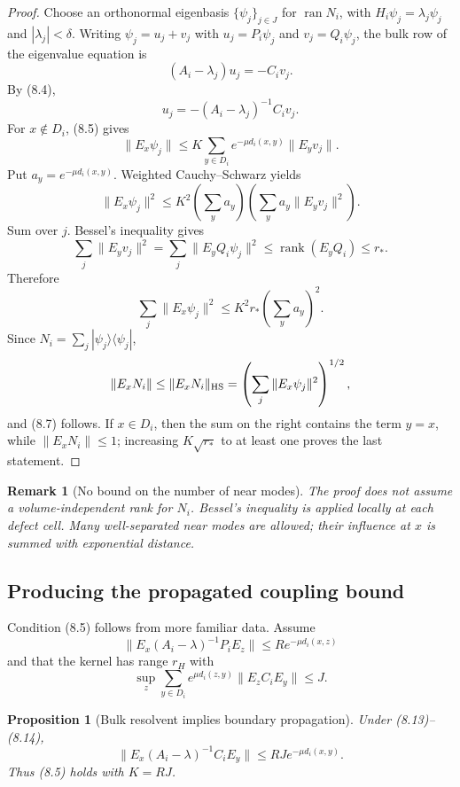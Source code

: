\documentclass[11pt]{article}
\newtheorem{proposition}[theorem]{Proposition}
\newtheorem{remark}[theorem]{Remark}
\begin{document}
\begin{proof}
Choose an orthonormal eigenbasis
\(\{\psi_j\}_{j\in J}\) for \(\operatorname{ran}N_i\), with
\(H_i\psi_j=\lambda_j\psi_j\) and \(|\lambda_j|<\delta\).
Writing \(\psi_j=u_j+v_j\) with
\(u_j=P_i\psi_j\) and \(v_j=Q_i\psi_j\), the bulk row of the eigenvalue
equation is
\[
 (A_i-\lambda_j)u_j=-C_iv_j.
\]
By (8.4),
\[
 u_j=-(A_i-\lambda_j)^{-1}C_iv_j.
 \tag{8.8}
\]
For \(x\notin D_i\), (8.5) gives
\[
 \|E_x\psi_j\|
 \leq
 K\sum_{y\in D_i}e^{-\mu d_i(x,y)}\|E_yv_j\|.
 \tag{8.9}
\]
Put \(a_y=e^{-\mu d_i(x,y)}\).  Weighted Cauchy--Schwarz yields
\[
 \|E_x\psi_j\|^2
 \leq
 K^2\left(\sum_ya_y\right)
 \left(\sum_ya_y\|E_yv_j\|^2\right).
 \tag{8.10}
\]
Sum over \(j\).  Bessel's inequality gives
\[
 \sum_j\|E_yv_j\|^2
 =
 \sum_j\|E_yQ_i\psi_j\|^2
 \leq\operatorname{rank}(E_yQ_i)\leq r_*.
 \tag{8.11}
\]
Therefore
\[
 \sum_j\|E_x\psi_j\|^2
 \leq
 K^2r_*\left(\sum_ya_y\right)^2.
 \tag{8.12}
\]
Since
\(N_i=\sum_j|\psi_j\rangle\langle\psi_j|\),
\[
 \|E_xN_i\|
 \leq\|E_xN_i\|_{\rm HS}
 =
 \left(\sum_j\|E_x\psi_j\|^2\right)^{1/2},
\]
and (8.7) follows.  If \(x\in D_i\), then the sum on the right contains
the term \(y=x\), while \(\|E_xN_i\|\leq1\); increasing
\(K\sqrt{r_*}\) to at least one proves the last statement.
\end{proof}

\begin{remark}[No bound on the number of near modes]
\label{rem:v11v8-rank}
The proof does not assume a volume-independent rank for \(N_i\).
Bessel's inequality is applied locally at each defect cell.  Many
well-separated near modes are allowed; their influence at \(x\) is
summed with exponential distance.
\end{remark}

\subsection{Producing the propagated coupling bound}

Condition (8.5) follows from more familiar data.  Assume
\[
 \|E_x(A_i-\lambda)^{-1}P_iE_z\|
 \leq R e^{-\mu d_i(x,z)}
 \tag{8.13}
\]
and that the kernel has range \(r_H\) with
\[
 \sup_z\sum_{y\in D_i}
 e^{\mu d_i(z,y)}\|E_zC_iE_y\|\leq J.
 \tag{8.14}
\]

\begin{proposition}[Bulk resolvent implies boundary propagation]
\label{prop:v11v8-propagation}
Under (8.13)--(8.14),
\[
 \|E_x(A_i-\lambda)^{-1}C_iE_y\|
 \leq RJ e^{-\mu d_i(x,y)}.
 \tag{8.15}
\]
Thus (8.5) holds with \(K=RJ\).
\end{proposition}
\end{document}
